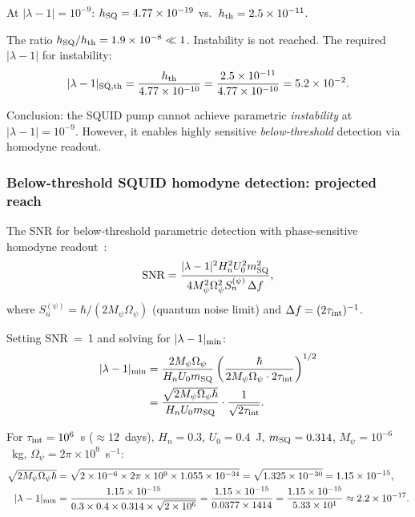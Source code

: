 \documentclass[11pt,twocolumn]{article}
\newcommand{\lam}{\lambda}
\newcommand{\Opsi}{\Omega_\psi}
\newcommand{\Mpsi}{M_\psi}
\begin{document}
At $|\lam-1| = 10^{-9}$:
$h_{\rm SQ} = 4.77\times10^{-19}$ vs.\
$h_{\rm th} = 2.5\times10^{-11}$.

The ratio $h_{\rm SQ}/h_{\rm th} = 1.9\times10^{-8} \ll 1$.
Instability is not reached. The required $|\lam-1|$ for instability:
\begin{equation}
|\lam-1|_{\rm SQ,th}
= \frac{h_{\rm th}}{4.77\times10^{-10}}
= \frac{2.5\times10^{-11}}{4.77\times10^{-10}} = 5.2\times10^{-2}.
\label{eq:squid_lambda_threshold}
\end{equation}

Conclusion: the SQUID pump cannot achieve parametric \emph{instability}
at $|\lam-1| = 10^{-9}$. However, it enables highly sensitive
\emph{below-threshold} detection via homodyne readout.

\subsubsection{Below-threshold SQUID homodyne detection: projected reach}

The SNR for below-threshold parametric detection with phase-sensitive
homodyne readout~\cite{npjQI2021}:
\begin{equation}
{\rm SNR} = \frac{|\lam-1|^2 H_n^2 U_0^2 m_{\rm SQ}^2}
{4\Mpsi^2\Opsi^2 S_n^{(\psi)}\,\Delta f},
\label{eq:SNR_homodyne}
\end{equation}
where $S_n^{(\psi)} = \hbar/(2\Mpsi\Opsi)$ (quantum noise limit)
and $\Delta f = (2\tau_{\rm int})^{-1}$.

Setting SNR~=~1 and solving for $|\lam-1|_{\rm min}$:
\begin{align}
|\lam-1|_{\rm min} &= \frac{2\Mpsi\Opsi}{H_n U_0 m_{\rm SQ}}
\left(\frac{\hbar}{2\Mpsi\Opsi\cdot2\tau_{\rm int}}\right)^{1/2}
\nonumber\\
&= \frac{\sqrt{2\Mpsi\Opsi\hbar}}{H_n U_0 m_{\rm SQ}}
\cdot\frac{1}{\sqrt{2\tau_{\rm int}}}.
\label{eq:lambda_min_SQUID}
\end{align}

For $\tau_{\rm int} = 10^6$~s ($\approx 12$~days),
$H_n = 0.3$, $U_0 = 0.4$~J, $m_{\rm SQ} = 0.314$,
$\Mpsi = 10^{-6}$~kg, $\Opsi = 2\pi\times10^9$~s$^{-1}$:
\begin{align}
\sqrt{2\Mpsi\Opsi\hbar}
&= \sqrt{2\times10^{-6}\times2\pi\times10^9\times1.055\times10^{-34}}
= \sqrt{1.325\times10^{-30}}
= 1.15\times10^{-15},
\nonumber\\
|\lam-1|_{\rm min} &= \frac{1.15\times10^{-15}}
{0.3\times0.4\times0.314\times\sqrt{2\times10^6}}
= \frac{1.15\times10^{-15}}{0.0377\times1414}
= \frac{1.15\times10^{-15}}{5.33\times10^{1}}
\approx 2.2\times10^{-17}.
\label{eq:squid_reach_q}
\end{align}
\end{document}
